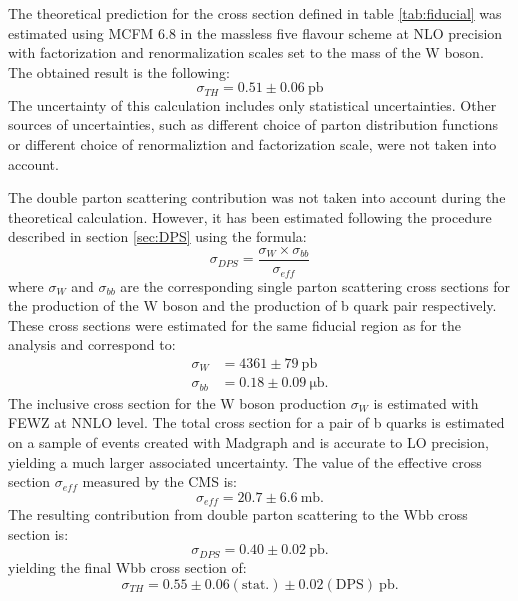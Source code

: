 The theoretical prediction for the cross section defined in table \ref{tab:fiducial} was estimated using MCFM 6.8 in the massless five flavour scheme at NLO precision with factorization and renormalization scales set to the mass of the W boson. The obtained result is the following:
\begin{equation*}
\sigma_{TH}=0.51\pm 0.06 \mathrm{\ pb}
\end{equation*} 
The uncertainty of this calculation includes only statistical uncertainties. Other sources of  uncertainties, such as different choice of parton distribution functions or different choice of renormaliztion and factorization scale, were not taken into account. 
\par The double parton scattering contribution was not taken into account during the theoretical calculation. However, it has been estimated following the procedure described in section \ref{sec:DPS} using the formula:
\begin{equation}
\sigma_{DPS} = \frac{\sigma_W \times \sigma_{bb}}{\sigma_{eff}}
\end{equation}
where $\sigma_W$ and $\sigma_{bb}$ are the corresponding single parton scattering cross sections for the production of the W boson and the production of b quark pair respectively. These cross sections were estimated for the same fiducial region as for the analysis and correspond to:
\begin{align*}
\sigma_{W} &= 4361 \pm 79 \mathrm{\ pb} \\
\sigma_{bb} &= 0.18 \pm 0.09 \mathrm{\ \mu b}.
\end{align*}
The inclusive cross section for the W boson production $\sigma_W$ is estimated with FEWZ \cite{Gavin:2012sy} at NNLO level. The total cross section for a pair of b quarks is estimated on a sample of events created with Madgraph and is accurate to LO precision, yielding a much larger associated uncertainty. The value of the effective cross section $\sigma_{eff}$ measured by the CMS is:
\begin{equation*}
\sigma_{eff}=20.7 \pm 6.6 \mathrm{\ mb}.
\end{equation*}   
The resulting contribution from double parton scattering to the Wbb cross section is:
\begin{equation*}
\sigma_{DPS}=0.40 \pm 0.02 \mathrm{\ pb}.
\end{equation*}
yielding the final Wbb cross section of:
\begin{equation*}
\sigma_{TH} = 0.55 \pm 0.06 \mathrm{(stat.)} \pm 0.02 \mathrm{(DPS)} \mathrm{\ pb}.
\end{equation*}

